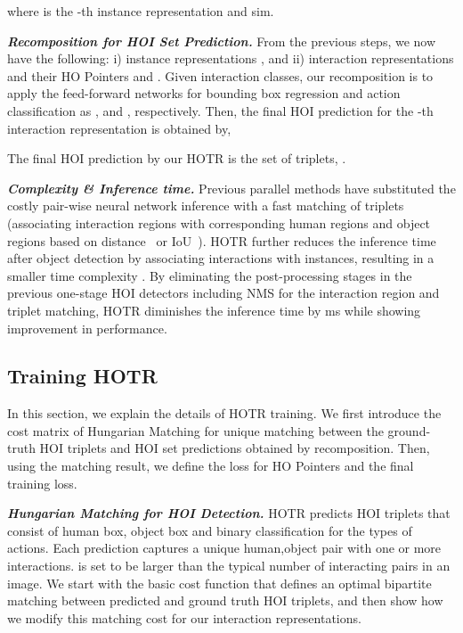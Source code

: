 \documentclass[final]{cvpr}
\begin{document}
where  is the -th instance representation and sim.
\newline

\noindent\textit{\textbf{Recomposition for HOI Set Prediction.}}
From the previous steps, we now have the following:
i)  instance representations , and
ii)  interaction representations  and their HO Pointers  and .
Given  interaction classes, our recomposition is to apply the feed-forward networks for bounding box regression and action classification as , and , respectively.
Then, the final HOI prediction for the -th interaction representation  is obtained by,

The final HOI prediction by our HOTR is the set of  triplets, .
\newline

\noindent\textit{\textbf{Complexity \& Inference time.}}
Previous parallel methods have substituted the costly pair-wise neural network inference with a fast matching of triplets (associating interaction regions with corresponding human regions and object regions based on distance~\cite{wang2020learning} or IoU~\cite{bkim2020uniondet}).
HOTR further reduces the inference time after object detection by associating  interactions with  instances, resulting in a smaller time complexity .
By eliminating the post-processing stages in the previous one-stage HOI detectors including NMS for the interaction region and triplet matching, HOTR diminishes the inference time by ms while showing improvement in performance.
\newline \subsection{Training HOTR}
In this section, we explain the details of HOTR training.
We first introduce the cost matrix of Hungarian Matching for unique matching between the ground-truth HOI triplets and HOI set predictions obtained by recomposition.
Then, using the matching result, we define the loss for HO Pointers and the final training loss.
\newline

\noindent\textit{\textbf{Hungarian Matching for HOI Detection.}}
HOTR predicts  HOI triplets that consist of human box, object box and binary classification for the  types of actions.
Each prediction captures a unique human,object pair with one or more interactions.
 is set to be larger than the typical number of interacting pairs in an image.
We start with the basic cost function that defines an optimal bipartite matching between predicted and ground truth HOI triplets, and then show how we modify this matching cost for our interaction representations.
\end{document}
